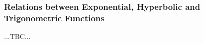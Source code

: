 %
%

\subsubsection{Relations between Exponential, Hyperbolic and Trigonometric Functions}

...TBC...





